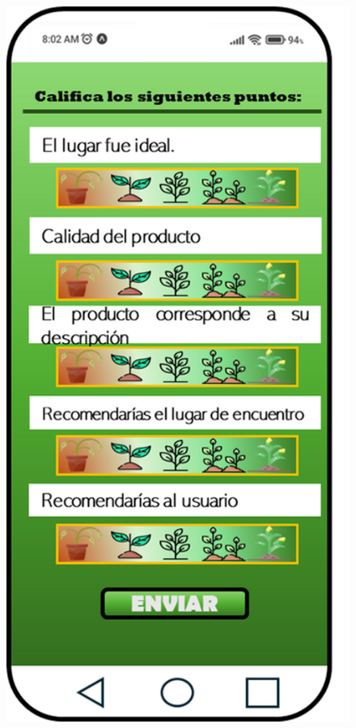 \documentclass[11pt, a4paper, oneside]{book}
\begin{document}
\begin{figure}[H]
    \centering
    \begin{minipage}{0.3\textwidth} 
        \centering
        \includegraphics[width=\textwidth]{Pictures/Imagen 1.png}

\end{minipage}
\end{figure}
\end{document}

